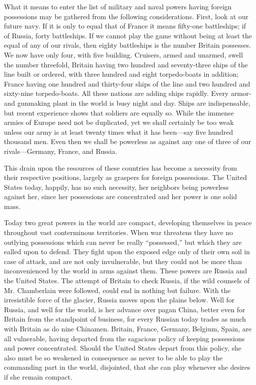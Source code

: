 \documentclass[11pt,openany]{book}
\begin{document}
What it means to enter the list of military and naval powers having foreign possessions may be gathered from the following considerations. First, look at our future navy. If it is only to equal that of France it means fifty-one battleships; if of Russia, forty battleships. If we cannot play the game without being at least the equal of any of our rivals, then eighty battleships is the number Britain possesses. We now have only four, with five building. Cruisers, armed and unarmed, swell the number threefold, Britain having two hundred and seventy-three ships of the line built or ordered, with three hundred and eight torpedo-boats in addition; France having one hundred and thirty-four ships of the line and two hundred and sixty-nine torpedo-boats. All these nations are adding ships rapidly. Every armor- and gunmaking plant in the world is busy night and day. Ships are indispensable, but recent experience shows that soldiers are equally so. While the immense armies of Europe need not be duplicated, yet we shall certainly be too weak unless our army is at least twenty times what it has been---say five hundred thousand men. Even then we shall be powerless as against any one of three of our rivals---Germany, France, and Russia.

This drain upon the resources of these countries has become a necessity from their respective positions, largely as graspers for foreign possessions. The United States today, happily, has no such necessity, her neighbors being powerless against her, since her possessions are concentrated and her power is one solid mass.

Today two great powers in the world are compact, developing themselves in peace throughout vast conterminous territories. When war threatens they have no outlying possessions which can never be really ``possessed,'' but which they are ealled upon to defend. They fight upon the exposed edge only of their own soil in case of attack, and are not only invulnerable, but they could not be more than inconvenienced by the world in arms against them. These powers are Russia and the United States. The attempt of Britain to check Russia, if the wild counsels of Mr. Chamberlain were followed, could end in nothing but failure. With the irresistible force of the glacier, Russia moves upon the plains below. Well for Russia, and well for the world, is her advance over pagan China, better even for Britain from the standpoint of business, for every Russian today trades as much with Britain as do nine Chinamen. Britain, France, Germany, Belgium, Spain, are all vulnerable, having departed from the sagacious policy of keeping possessions and power concentrated. Should the United States depart from this policy, she also must be so weakened in consequence as never to be able to play the commanding part in the world, disjointed, that she can play whenever she desires if she remain compact.
\end{document}
